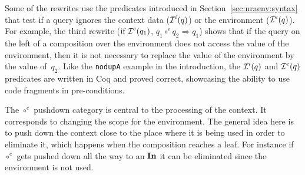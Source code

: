 Some of the rewrites use the predicates introduced in
Section~\ref{sec:nraenv:syntax} that test if a query ignores the
context data ($\igni{q}$) or the environment ($\igne{q}$).
%
For example, the third rewrite ($\mbox{if~} \igne{q_1}$, ${q_1 \circ^e
  q_2 \Rightarrow q_1}$) shows that if the query on the left of a
composition over the environment does not access the value of the
environment, then it is not necessary to replace the value of the
environment by the value of~$q_2$.  Like the \texttt{nodupA} example
in the introduction, the $\igni{q}$ and $\igne{q}$ predicates are
written in Coq and proved correct, showcasing the ability to use code
fragments in pre-conditions.

The $\circ^e$ pushdown category is central to the processing of the
context. It corresponds to changing the scope for the environment. The
general idea here is to push down the context close to the place where
it is being used in order to eliminate it, which happens when the
composition reaches a leaf. For instance if $\circ^e$ gets pushed down
all the way to an $\textup{\textbf{{In}}}$ it can be eliminated since the
environment is not used.

